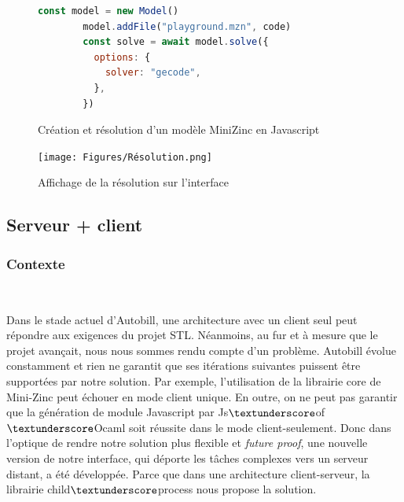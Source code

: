 \documentclass[12pt]{article}
\begin{document}
\begin{figure}
      \centering
          \begin{lstlisting}[language=javascript]
        const model = new Model()
        model.addFile("playground.mzn", code)
        const solve = await model.solve({
          options: {
            solver: "gecode",
          },
        })
    \end{lstlisting}
    \caption{Création et résolution d'un modèle MiniZinc en Javascript}
      \texttt{[image: Figures/Résolution.png]}
      \caption{Affichage de la résolution sur l'interface\label{fig8}}
\end{figure}



\pagebreak

\hypertarget{serveur-client}{%
      \subsection{Serveur + client}\label{serveur-client}}

\subsubsection{Contexte}\

Dans le stade actuel d'Autobill, une architecture avec un client seul
peut répondre aux exigences du projet STL. Néanmoins, au fur et à mesure que le projet avançait, nous nous sommes rendu compte d'un problème. Autobill évolue constamment et rien ne garantit que ses itérations suivantes puissent
être supportées par notre solution. Par exemple, l'utilisation de la librairie core de Mini-Zinc peut échouer en mode client unique. En outre, on ne peut pas garantir que la génération de module Javascript par Js$\textunderscore$of$\textunderscore$Ocaml soit réussite dans le mode client-seulement.  Donc dans l'optique de rendre notre solution plus flexible et \emph{future proof}, une nouvelle version de notre interface, qui déporte les tâches complexes vers un serveur distant, a été développée. Parce que dans une architecture client-serveur, la librairie child$\textunderscore$process nous propose la solution. \\
\end{document}
